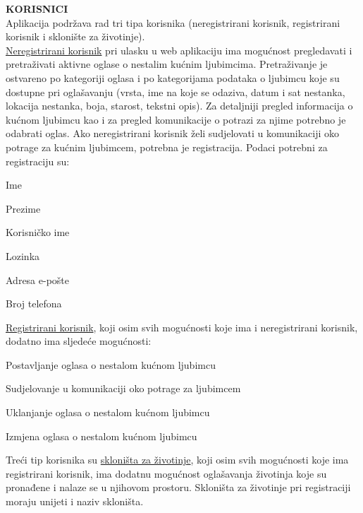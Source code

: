 		\textbf{KORISNICI}\\
		Aplikacija podržava rad tri tipa korisnika (neregistrirani korisnik, registrirani korisnik i sklonište za životinje).\\
		\underline{Neregistrirani korisnik} pri ulasku u web aplikaciju ima mogućnost pregledavati i pretraživati aktivne oglase o nestalim kućnim ljubimcima. Pretraživanje je ostvareno po kategoriji oglasa i po kategorijama podataka o ljubimcu koje su dostupne pri oglašavanju (vrsta, ime na koje se odaziva, datum i sat nestanka, lokacija nestanka, boja, starost, tekstni opis). Za detaljniji pregled informacija o kućnom ljubimcu kao i za pregled komunikacije o potrazi za njime potrebno je odabrati oglas. Ako neregistrirani korisnik želi sudjelovati u komunikaciji oko potrage za kućnim ljubimcem, potrebna je registracija.
		Podaci potrebni za registraciju su:
		\begin{packed_item}
			\item Ime
			\item Prezime
			\item Korisničko ime
			\item Lozinka
			\item Adresa e-pošte
			\item Broj telefona
	    \end{packed_item}
	    \underline{Registrirani korisnik}, koji osim svih mogućnosti koje ima i neregistrirani korisnik, dodatno ima sljedeće mogućnosti:
		\begin{packed_item}
			\item Postavljanje oglasa o nestalom kućnom ljubimcu 
			\item Sudjelovanje u komunikaciji oko potrage za ljubimcem
			\item Uklanjanje oglasa o nestalom kućnom ljubimcu
			\item Izmjena oglasa o nestalom kućnom ljubimcu
		\end{packed_item}
		Treći tip korisnika su \underline{skloništa za životinje}, koji osim svih mogućnosti koje ima registrirani korisnik, ima dodatnu mogućnost oglašavanja životinja koje su pronađene i nalaze se u njihovom prostoru. Skloništa za životinje pri registraciji moraju unijeti i naziv skloništa.\\
		
